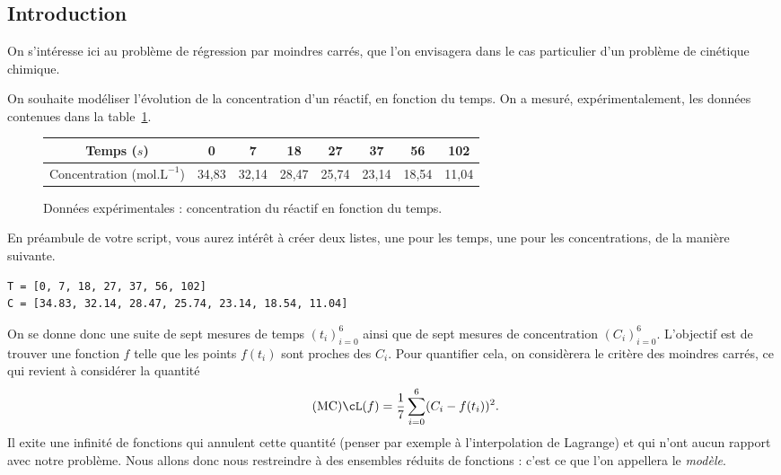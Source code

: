 \section{}
\subsection{Introduction}

On s'intéresse ici au problème de régression par moindres carrés, que l'on envisagera dans le cas particulier d'un problème de cinétique chimique. 

On souhaite modéliser l'évolution de la concentration d'un réactif, en fonction du temps. On a 
mesuré, expérimentalement, les données contenues dans la table~\ref{table:donnees}.
\begin{figure}[!h]
  \begin{center}
    \setlength\extrarowheight{2.5pt}
    \begin{tabular}{|c|c|c|c|c|c|c|c|}
      \hline
      Temps ($s$) & 0 & 7 & 18 & 27 & 37 & 56 & 102 \\[2.5pt]
      \hline
      Concentration ($\textrm{mol}.\textrm{L}^{-1}$) & 34,83 & 32,14 & 28,47 & 25,74 & 23,14 & 18,54 & 11,04\\[2.5pt]
      \hline
    \end{tabular}
    \caption{Données expérimentales : concentration du réactif en fonction du temps.}
    \label{table:donnees}
  \end{center}
\end{figure}

\begin{rem}
  En préambule de votre script, vous aurez intérêt à créer deux listes, une pour les temps, une pour les concentrations, de la manière suivante. 
\begin{verbatim}
T = [0, 7, 18, 27, 37, 56, 102]
C = [34.83, 32.14, 28.47, 25.74, 23.14, 18.54, 11.04]
\end{verbatim}

\end{rem}


On se donne donc une suite de sept mesures de temps $(t_i)_{i=0}^6$ ainsi que de sept mesures de concentration $(C_i)_{i=0}^6$. 
L'objectif est de trouver une fonction $f$ telle que les points $f(t_i)$ sont proches des $C_i$. 
Pour quantifier cela, on considèrera le critère des moindres carrés, ce qui revient à considérer la quantité 
\begin{equation}\label{eq.mc}\tag{MC}
  \cL(f) = \dfrac{1}{7}\sum_{i=0}^6 (C_i - f(t_i))^2 .
\end{equation}
Il exite une infinité de fonctions qui annulent cette quantité (penser par exemple à l'interpolation de Lagrange) et qui n'ont aucun rapport avec notre problème. 
Nous allons donc nous restreindre à des ensembles réduits de fonctions : c'est ce que l'on appellera le \emph{modèle}.

